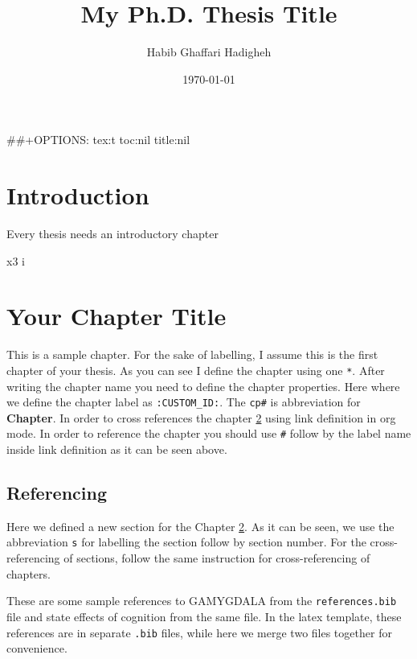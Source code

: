 \documentclass[12pt]{report}
\author{Habib Ghaffari Hadigheh}
\date{\today}
\title{My Ph.D. Thesis Title}
\numberwithin{equation}{section}
\begin{document}
\maketitle
\tableofcontents

\#\#+OPTIONS:  tex:t toc:nil title:nil

\beforepreface                                         %
\afterpreface
\chapter{Introduction}
\label{sec:orge371da8}
Every thesis needs an introductory chapter

\setcounter{figure}{0}
\setcounter{equation}{0}x3
\setcounter{table}{0}i
\chapter{Your Chapter Title}
\label{cp1}
This is a sample chapter. For the sake of labelling, I assume this is the first
chapter of your thesis. As you can see I define the chapter using one \texttt{*}. After
writing the chapter name you need to define the chapter properties. Here where
we define the chapter label as \texttt{:CUSTOM\_ID:}. The \texttt{cp\#} is abbreviation for
\textbf{Chapter}. In order to cross references the chapter \ref{cp1} using link definition
in org mode. In order to reference the chapter you should use \texttt{\#} follow by the
label name inside link definition as it can be seen above.

\section{Referencing}
\label{cp1:s1}
Here we defined a new section for the Chapter \ref{cp1}. As it can be seen, we use
the abbreviation \texttt{s} for labelling the section follow by section number. For the
cross-referencing of sections, follow the same instruction for
cross-referencing of  chapters.

These are some sample references to GAMYGDALA \citep{popescu2014gamygdala} from
the \texttt{references.bib} file and state effects of cognition
\citep{hudlicka2002time} from the same file. In the latex template, these
references are in separate \texttt{.bib} files, while here we merge two files
together for convenience.
\end{document}

